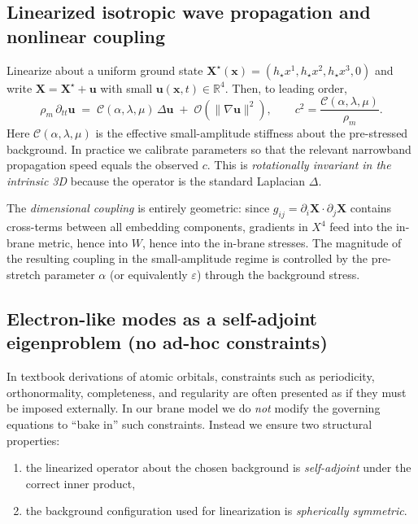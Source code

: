 \documentclass[11pt,a4paper]{article}
\begin{document}
\subsection{Linearized isotropic wave propagation and nonlinear coupling}
Linearize about a uniform ground state
$\mathbf{X}^\star(\mathbf{x})=(h_\star x^1,h_\star x^2,h_\star x^3,0)$ and write
$\mathbf{X}=\mathbf{X}^\star+\mathbf{u}$ with small $\mathbf{u}(\mathbf{x},t)\in\mathbb{R}^4$.
Then, to leading order,
\begin{equation}
  \rho_m\,\partial_{tt}\mathbf{u} \;=\; \mathcal{C}(\alpha,\lambda,\mu)\,\Delta\mathbf{u}
  \;+\;\mathcal{O}(\|\nabla\mathbf{u}\|^2),
  \qquad
  c^2=\frac{\mathcal{C}(\alpha,\lambda,\mu)}{\rho_m}.
  \label{eq:linear_wave}
\end{equation}
Here \(\mathcal{C}(\alpha,\lambda,\mu)\) is the effective small-amplitude stiffness about the pre-stressed background.
In practice we calibrate parameters so that the relevant narrowband propagation speed equals the observed \(c\).
This is \emph{rotationally invariant in the intrinsic 3D} because the operator is
the standard Laplacian $\Delta$.

The \emph{dimensional coupling} is entirely geometric: since
$g_{ij}=\partial_i\mathbf{X}\cdot\partial_j\mathbf{X}$ contains cross-terms
between all embedding components, gradients in $X^4$ feed into the in-brane
metric, hence into $W$, hence into the in-brane stresses. The magnitude of the
resulting coupling in the small-amplitude regime is controlled by the pre-stretch
parameter $\alpha$ (or equivalently $\varepsilon$) through the background stress.

\subsection{Electron-like modes as a self-adjoint eigenproblem (no ad-hoc constraints)}
\label{subsec:selfadjoint_eigenproblem}

In textbook derivations of atomic orbitals, constraints such as periodicity, orthonormality, completeness,
and regularity are often presented as if they must be imposed externally. In our brane model we do \emph{not}
modify the governing equations to ``bake in'' such constraints. Instead we ensure two structural properties:

\begin{enumerate}
\item the linearized operator about the chosen background is \emph{self-adjoint} under the correct inner product,
\item the background configuration used for linearization is \emph{spherically symmetric}.
\end{enumerate}
\end{document}
